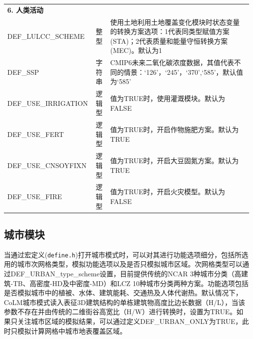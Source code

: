 \documentclass[a4paper,12pt,twoside]{article}
\begin{document}
{\begin{longtable}[!htbp]{lcp{}}
\textbf{6. 人类活动} && \\

DEF\_LULCC\_SCHEME & 整型 & 使用土地利用土地覆盖变化模块时状态变量的转换方案选项：1代表同类型赋值方案(STA)；2代表质量和能量守恒转换方案(MEC)。默认为1 \\
DEF\_SSP & 字符串 &  CMIP6未来二氧化碳浓度数据，其值代表不同的情景：`126'，`245'，`370',`585'，默认值为`585' \\
DEF\_USE\_IRRIGATION & 逻辑型 & 值为TRUE时，使用灌溉模块。默认为FALSE \\
DEF\_USE\_FERT & 逻辑型 & 值为TRUE时，开启作物施肥方案。默认为TRUE\\
DEF\_USE\_CNSOYFIXN & 逻辑型 & 值为TRUE时，开启大豆固氮方案。默认为TRUE \\
DEF\_USE\_FIRE & 逻辑型 & 值为TRUE时，开启火灾模型。默认为FALSE \\

\end{longtable}}

\subsection{城市模块}

当通过宏定义(\texttt {define.h})打开城市模式时，可以对其进行功能选项细分，包括所选用的城市次网格类型，模拟功能选项以及是否只模拟城市区域。次网格类型可以通过DEF\_URBAN\_type\_scheme设置，目前提供传统的NCAR 3种城市分类（高建筑-TB、高密度-HD及中密度-MD）和LCZ 10种城市分类两种方案。功能选项包括是否模拟城市中的植被、水体、建筑能耗、交通热及人体代谢热。默认情况下，CoLM城市模式读入表征3D建筑结构的单栋建筑物高度比边长数据（H/L），当该参数不存在并由传统的二维街谷高宽比（H/W）进行转换时，设置为TRUE。如果只关注城市区域的模拟结果，可以通过定义DEF\_URBAN\_ONLY为TRUE，此时只模拟计算网格中城市地表覆盖区域。
\end{document}
